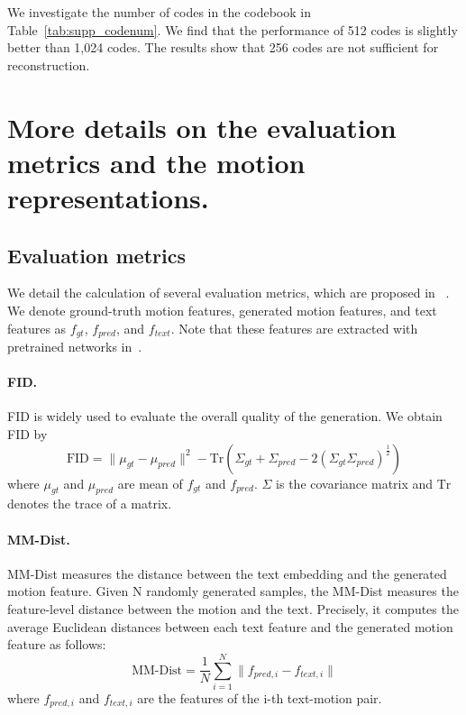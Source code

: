 \documentclass[10pt,twocolumn,letterpaper]{article}
\begin{document}
We investigate the number of codes in the codebook in Table~\ref{tab:supp_codenum}. We find that the performance of 512 codes is slightly better than 1,024 codes. The results show that 256 codes are not sufficient for reconstruction. 


\section{More details on the evaluation metrics and the motion representations.}
\label{sec:supp_metrics}

\subsection{Evaluation metrics}

We detail the calculation of several evaluation metrics, which are proposed in ~\cite{guo2022generating}. We denote ground-truth motion features, generated motion features, and text features as $f_{gt}$, $f_{pred}$, and $f_{text}$. Note that these features are extracted with pretrained networks in~\cite{guo2022generating}.

\paragraph{FID.}
FID is widely used to evaluate the overall quality of the generation. We obtain FID by
\begin{equation}
\text{FID} = \lVert \mu_{gt} - \mu_{pred}\rVert^2 - \text{Tr}(\Sigma_{gt} + \Sigma_{pred} - 2(\Sigma_{gt}\Sigma_{pred})^{\frac{1}{2}})
\label{formula:fid}
\end{equation}
where $\mu_{gt}$ and $\mu_{pred}$ are mean of $f_{gt}$ and $f_{pred}$. $\Sigma$ is the covariance matrix and $\text{Tr}$ denotes the trace of a matrix.

\paragraph{MM-Dist.}
MM-Dist measures the distance between the text embedding and the generated motion feature. Given N randomly generated samples, the MM-Dist measures the feature-level distance between the motion and the text. Precisely, it computes the average Euclidean distances between each text feature and the
generated motion feature as follows:
\begin{equation}
\text{MM-Dist} = \frac{1}{N}\sum_{i=1}^{N}\lVert f_{pred,i} - f_{text,i}\rVert
\label{formula:mm-dis}
\end{equation}
where $f_{pred,i}$ and  $f_{text,i}$ are the features of the i-th text-motion pair. 
\end{document}
